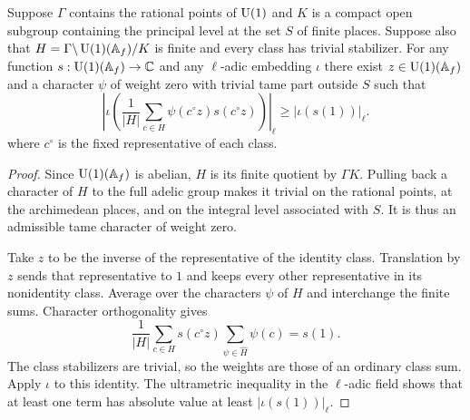 \begin{lemma}
\label{lem:c-test-character-average}
\emitthmsource
Suppose $\Gamma$ contains the rational points of $\operatorname{U}(1)$ and $K$ is a compact open subgroup containing the principal level at the set $S$ of finite places. Suppose also that $H=\Gamma\backslash \operatorname{U}(1)(\mathbb A_f)/K$ is finite and every class has trivial stabilizer. For any function $s:\operatorname{U}(1)(\mathbb A_f)\to\mathbb C$ and any $\ell$-adic embedding $\iota$ there exist $z\in \operatorname{U}(1)(\mathbb A_f)$ and a character $\psi$ of weight zero with trivial tame part outside $S$ such that
\[
 \left|\iota\left(\frac1{|H|}\sum_{c\in H}\psi(c^\circ z)s(c^\circ z)\right)\right|_\ell
 \ge |\iota(s(1))|_\ell .
\]
where $c^\circ$ is the fixed representative of each class.
\end{lemma}
\begin{proof}
Since $\operatorname{U}(1)(\mathbb A_f)$ is abelian, $H$ is its finite quotient by $\Gamma K$. Pulling back a character of $H$ to the full adelic group makes it trivial on the rational points, at the archimedean places, and on the integral level associated with $S$. It is thus an admissible tame character of weight zero.

Take $z$ to be the inverse of the representative of the identity class. Translation by $z$ sends that representative to $1$ and keeps every other representative in its nonidentity class. Average over the characters $\psi$ of $H$ and interchange the finite sums. Character orthogonality gives
\[
 \frac1{|H|}\sum_{c\in H}s(c^\circ z)
         \sum_{\psi\in\widehat H}\psi(c)=s(1).
\]
The class stabilizers are trivial, so the weights are those of an ordinary class sum. Apply $\iota$ to this identity. The ultrametric inequality in the $\ell$-adic field shows that at least one term has absolute value at least $|\iota(s(1))|_\ell$.
\end{proof}

